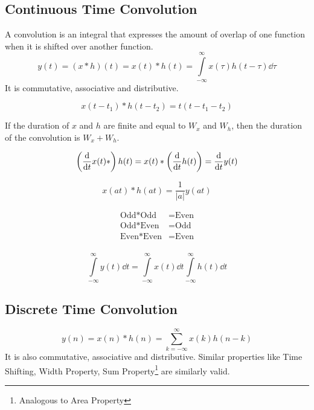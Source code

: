 		\subsection{Continuous Time Convolution}
		A convolution is an integral that expresses the amount of overlap of one function when it is shifted over another function.
		\[y(t)=(x\ast h)(t)=x(t)\ast h(t)=\int\limits_{-\infty}^\infty x(\tau)h(t-\tau)\dd{\tau}\]
		It is commutative, associative and distributive.
		\begin{theorem}
			\[x(t-t_1)\ast h(t-t_2)=t(t-t_1-t_2)\]
		\end{theorem}
		\begin{theorem}
			If the duration of $x$ and $h$ are finite and equal to $W_x$ and $W_h$, then the duration of the convolution is $W_x+W_h$.
		\end{theorem}
		\begin{theorem}
			\[\left(\dv{t}x(t)\ast\right)h(t)=x(t)\ast\left(\dv{t}h(t)\right)=\dv{t}y(t)\]
		\end{theorem}
		\begin{theorem}
			\[x(at)\ast h(at)=\frac{1}{|a|}y(at)\]
		\end{theorem}
		\begin{theorem}
			\[\begin{split}
				\text{Odd}\ast\text{Odd} &=\text{Even}\\
				\text{Odd}\ast\text{Even} &=\text{Odd}\\
				\text{Even}\ast\text{Even} &=\text{Even}\\
			\end{split}\]
		\end{theorem}
		\begin{theorem}
			\[\int\limits_{-\infty}^\infty y(t)\dd{t}=\int\limits_{-\infty}^\infty x(t)\dd{t}\int\limits_{-\infty}^\infty h(t)\dd{t}\]
		\end{theorem}
		\subsection{Discrete Time Convolution}
		\[y(n)=x(n)\ast h(n)=\sum\limits_{k=-\infty}^\infty x(k)h(n-k)\]
		It is also commutative, associative and distributive. Similar properties like Time Shifting, Width Property, Sum Property\footnote{Analogous to Area Property} are similarly valid.
